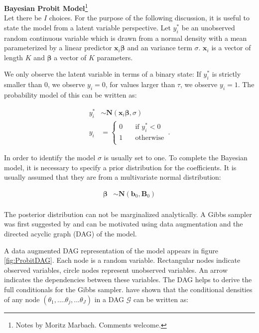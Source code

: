 \documentclass[11pt,a4paper]{article}
\begin{document}
\textbf{Bayesian Probit Model}\footnote{Notes by Moritz Marbach. Comments welcome.} \\

Let there be $I$ choices. For the purpose of the following discussion, it is useful to state the model from a latent variable perspective. Let $y_{i}^{*}$ be an unobserved random continuous variable which is drawn from a normal density with a mean parameterized by a linear predictor $\mathbf{x}_i \boldsymbol{\beta}$ and an variance term $\sigma$. $\mathbf{x}_i$ is a vector of length $K$ and $\boldsymbol{\beta}$ a vector of $K$ parameters. 

We only observe the latent variable in terms of a binary state: If $y_{i}^{*}$ is strictly smaller than 0, we observe $y_{i}=0$, for values larger than $\tau$, we observe $y_{i}=1$. The probability model of this can be written as:

\begin{equation}
\begin{split}
y^{*}_i &\sim \mathrm{\mathbf{N}}(\textbf{x}_i \boldsymbol{\beta} ,\sigma) \\
y_{i} &= \left \{
\begin{array}{ll}
	0 & \quad \text{if $y_{i}^{*} < 0$ }\\
	1 & \quad \text{otherwise}\\
\end{array} \right..
\end{split}	
\end{equation}

In order to identify the model $\sigma$ is usually set to one. To complete the Bayesian model, it is necessary to specify a prior distribution for the coefficients. It is usually assumed that they are from a multivariate normal distribution: 

\begin{equation}
\begin{split}
\boldsymbol{\beta} &\sim \mathrm{\mathbf{N}}(\textbf{b}_0, \textbf{B}_0) \\
\end{split}
\end{equation}

The posterior distribution can not be marginalized analytically. A Gibbs sampler was first suggested by \citet{Albert.Chib.1993} and can be motivated using data augmentation and the directed acyclic graph (DAG) of the model. 

A data augmented DAG representation of the model appears in figure \ref{fig:ProbitDAG}. Each node is a random variable. Rectangular nodes indicate observed variables, circle nodes represent unobserved variables. An arrow indicates the dependencies between these variables. The DAG helps to derive the full conditionals for the Gibbs sampler. \citet{Lauritzen.et.al.1990} have shown that the conditional densities of any node $(\theta_1, .... \theta_j,...\theta_J)$ in a DAG $\mathcal{G}$ can be written as:
\end{document}
